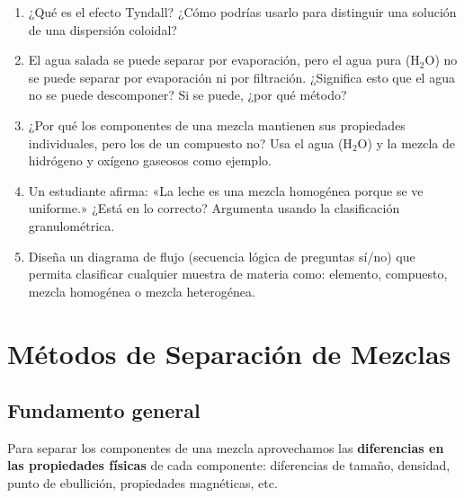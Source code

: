 \documentclass[12pt, letterpaper]{article}
\begin{document}
\begin{enumerate}[leftmargin=*, resume]
  \item \medio{} ¿Qué es el efecto Tyndall? ¿Cómo podrías usarlo para distinguir una solución de una dispersión coloidal?

  \item \dificil{} El agua salada se puede separar por evaporación, pero el agua pura (H$_2$O) no se puede separar por evaporación ni por filtración. ¿Significa esto que el agua no se puede descomponer? Si se puede, ¿por qué método?

  \item \dificil{} ¿Por qué los componentes de una mezcla mantienen sus propiedades individuales, pero los de un compuesto no? Usa el agua (H$_2$O) y la mezcla de hidrógeno y oxígeno gaseosos como ejemplo.

  \item \dificil{} Un estudiante afirma: «La leche es una mezcla homogénea porque se ve uniforme.» ¿Está en lo correcto? Argumenta usando la clasificación granulométrica.

  \item \dificil{} Diseña un diagrama de flujo (secuencia lógica de preguntas sí/no) que permita clasificar cualquier muestra de materia como: elemento, compuesto, mezcla homogénea o mezcla heterogénea.
\end{enumerate}

\section{Métodos de Separación de Mezclas}

\subsection{Fundamento general}

Para separar los componentes de una mezcla aprovechamos las \textbf{diferencias en las propiedades físicas} de cada componente: diferencias de tamaño, densidad, punto de ebullición, propiedades magnéticas, etc.
\end{document}
